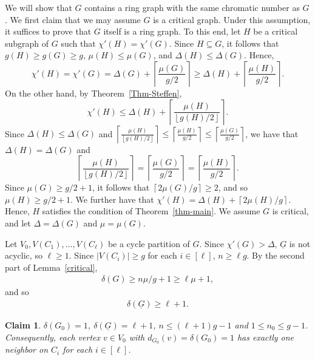 \documentclass[12pt,oneside]{amsart}
\newtheorem{claim}{Claim}[section]
\newcommand\roundup[1]{\left\lceil#1\right\rceil}
\newcommand\rounddown[1]{\left\lfloor#1\right\rfloor}
\begin{document}
We will show that $G$ contains a ring graph with the same chromatic number as $G$.
We first claim that we may assume $G$ is a critical graph.
Under this assumption, it suffices to prove that $G$ itself is a ring graph.  To this end, let $H$ be a critical subgraph of $G$ such that $\chi'(H) = \chi'(G)$.  Since $H\subseteq G$, it follows that  $g(H) \ge g(G) \ge g$, $\mu(H) \le \mu(G)$, and $\Delta(H) \le \Delta(G)$. Hence,
$$\chi'(H) =\chi'(G) =\Delta(G) +\roundup{\frac{\mu(G)}{g/2}} \ge \Delta(H) + \roundup{\frac{\mu(H)}{g/2}}.$$
On the other hand, by Theorem~\ref{Thm-Steffen}, $$\chi'(H) \le \Delta(H) + \roundup{\frac{\mu(H)}{\rounddown{g(H)/2}}}.$$
Since $\Delta(H) \le \Delta(G)$ and $\roundup{\frac{\mu(H)}{\rounddown{g(H)/2}}} \le \roundup{\frac{\mu(H)}{g/2}} \le \roundup{\frac{\mu(G)}{g/2}}$,
we have that $\Delta(H) = \Delta(G)$ and $$\roundup{\frac{\mu(H)}{\rounddown{g(H)/2}}} = \roundup{\frac{\mu(G)}{g/2}}=\roundup{\frac{\mu(H)}{g/2}}.
$$
Since $\mu(G) \ge g/2+1$, it follows that $\roundup{2\mu(G)/g} \ge 2$, and so $\mu(H)\geq g/2+1$.  We further have that $\chi'(H)=\Delta(H) + \roundup{2\mu(H)/g}$. Hence, $H$ satisfies the condition of Theorem~\ref{thm-main}.  We assume $G$ is critical,  and  let $\Delta =\Delta(G)$ and $\mu=\mu(G)$.

Let $V_0, V(C_1), \ldots, V(C_{\ell})$ be a cycle partition of $G$. Since $\chi'(G) > \Delta$, $\underline{G}$ is not acyclic,  so $\ell\geq 1$. Since $|V(C_i)| \ge g$ for each $i\in [\ell]$,  $n\geq \ell g$.  By the second part of Lemma~\ref{critical},
\begin{eqnarray}\label{eq: deltaell}
\delta(G)\geq  n\mu/g +1 \geq \ell\mu+1,
\end{eqnarray}
and so
\begin{eqnarray}\label{eq: deltaUell}
\delta(\underline{G})\geq  \ell+1.
\end{eqnarray}


\begin{claim} \label{claim5}
$\delta(G_0) =1$, $\delta(\underline{G})=\ell+1$,
$n \le (\ell +1) g -1$ and $1 \le n_0\leq g-1$.  Consequently, each vertex  $v\in V_0$ with $d_{G_0}(v) = \delta(G_0) =1$ has exactly one neighbor on  $C_i$ for  each $i\in [\ell]$.
\end{claim}
\end{document}
